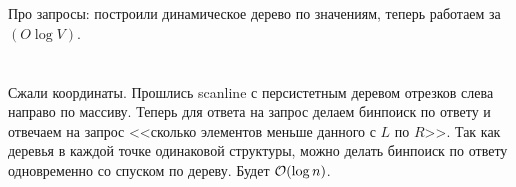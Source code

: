 \section{} %
Про запросы: построили динамическое дерево по значениям, теперь работаем за $(O\log V)$.

\section{} %
Сжали координаты.
Прошлись scanline с персистетным деревом отрезков слева направо по массиву.
Теперь для ответа на запрос делаем бинпоиск по ответу и отвечаем на запрос <<сколько элементов меньше данного с $L$ по $R$>>.
Так как деревья в каждой точке одинаковой структуры, можно делать бинпоиск по ответу одновременно со спуском по дереву.
Будет $\mathcal{O}(\log n)$.

\section{} %
\TODO

\section{} %

\section{} %

\section{} %

\section{} %

\section{} %

\section{} %

\section{} %

\section{} %

\section{} %

\section{} %

